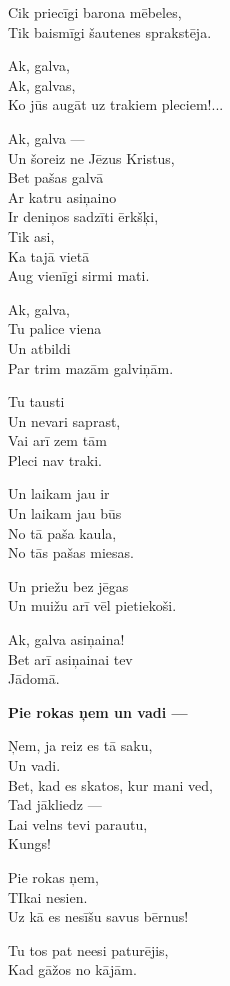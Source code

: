 \documentclass[14pt]{extarticle}
\begin{document}
Cik priecīgi barona mēbeles,\\
Tik baismīgi šautenes sprakstēja.

Ak, galva,\\
Ak, galvas,\\
Ko jūs augāt uz trakiem pleciem!...

Ak, galva ---\\
Un šoreiz ne Jēzus Kristus,\\
Bet pašas galvā\\
Ar katru asiņaino\\
Ir deniņos sadzīti ērkšķi,\\
Tik asi,\\
Ka tajā vietā\\
Aug vienīgi sirmi mati.

Ak, galva,\\
Tu palice viena\\
Un atbildi\\
Par trim mazām galviņām.

Tu tausti\\
Un nevari saprast,\\
Vai arī zem tām\\
Pleci nav traki.

Un laikam jau ir\\
Un laikam jau būs\\
No tā paša kaula,\\
No tās pašas miesas.

Un priežu bez jēgas\\
Un muižu arī vēl pietiekoši.

Ak, galva asiņaina!\\
Bet arī asiņainai tev\\
Jādomā.


\newpage

{\bf Pie rokas ņem un vadi ---}

Ņem, ja reiz es tā saku,\\
Un vadi.\\
Bet, kad es skatos, kur mani ved,\\
Tad jākliedz ---\\
Lai velns tevi parautu,\\
Kungs!

Pie rokas ņem,\\
TIkai nesien.\\
Uz kā es nesīšu savus bērnus!

Tu tos pat neesi paturējis,\\
Kad gāžos no kājām.
\end{document}
